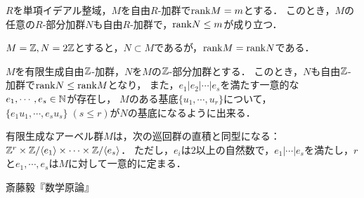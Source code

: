 \documentclass[uplatex,dvipdfmx]{jsreport}
\begin{document}
\begin{theorem}
    $R$を単項イデアル整域，$M$を自由$R$-加群で$\mathrm{rank} M=m$とする．
    このとき，$M$の任意の$R$-部分加群$N$も自由$R$-加群で，$\mathrm{rank} N\le m$が成り立つ．
\end{theorem}

\begin{example}[線形空間論との違い]
    $M=\mathbb{Z},N=2\mathbb{Z}$とすると，$N\subset M$であるが，$\mathrm{rank} M=\mathrm{rank} N$である．
\end{example}

\begin{theorem}
    $M$を有限生成自由$\mathbb{Z}$-加群，$N$を$M$の$\mathbb{Z}$-部分加群とする．
    このとき，$N$も自由$\mathbb{Z}$-加群で$\mathrm{rank} N\le\mathrm{rank} M$となり，
    また，$e_1|e_2|\cdots|e_s$を満たす一意的な$e_1,\cdots,e_s\in\mathbb{N}$が存在し，
    $M$のある基底$\{u_1,\cdots,u_r\}$について，$\{e_1u_1,\cdots,e_su_s\}\;(s\le r)$が$N$の基底になるように出来る．
\end{theorem}

\begin{corollary}
    有限生成なアーベル群$M$は，次の巡回群の直積と同型になる：$\mathbb{Z}^r\times\mathbb{Z}/\langle e_1\rangle\times\cdots\times\mathbb{Z}/\langle e_s\rangle$．
    ただし，$e_i$は$2$以上の自然数で，$e_1|\cdots|e_s$を満たし，$r$と$e_1,\cdots,e_s$は$M$に対して一意的に定まる．
\end{corollary}



\begin{thebibliography}{9}
    斎藤毅『数学原論』
\end{thebibliography}
\end{document}
